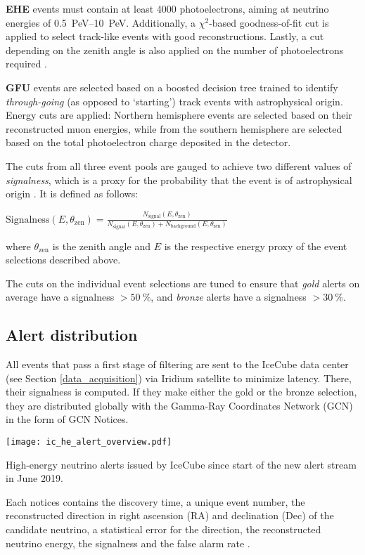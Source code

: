 \textbf{EHE} events must contain at least 4000 photoelectrons, aiming at neutrino energies of \SIrange{0.5}{10}{\peta\eV}. Additionally, a $\chi^2$-based goodness-of-fit cut is applied to select track-like events with good reconstructions. Lastly, a cut depending on the zenith angle is also applied on the number of photoelectrons required \cite{Tung2019}.

\textbf{GFU} events are selected based on a boosted decision tree trained to identify \textit{through-going} (as opposed to `starting') track events with astrophysical origin. Energy cuts are applied: Northern hemisphere events are selected based on their reconstructed muon energies, while from the southern hemisphere are selected based on the total photoelectron charge deposited in the detector.

The cuts from all three event pools are gauged to achieve two different values of \textit{signalness}, which is a proxy for the probability that the event is of astrophysical origin \cite{Tung2019}. It is defined as follows:
\begin{definition}\label{signalness_def}
$\text{Signalness}(E,\theta_\text{zen}) = \frac{N_\text{signal}(E,\theta_\text{zen})}{N_\text{signal}(E,\theta_\text{zen})+N_\text{background}(E,\theta_\text{zen})}$
\end{definition}
where $\theta_\text{zen}$ is the zenith angle and $E$ is the respective energy proxy of the event selections described above.

The cuts on the individual event selections are tuned to ensure that \textit{gold} alerts on average have a signalness $>\SI{50}{\percent}$, and \textit{bronze} alerts have a signalness $>\SI{30}{\percent}$.
\subsection{Alert distribution} \label{ic_alerts}
All events that pass a first stage of filtering are sent to the IceCube data center (see Section \ref{data_acquisition}) via Iridium satellite to minimize latency. There, their signalness is computed. If they make either the gold or the bronze selection, they are distributed globally with the Gamma-Ray Coordinates Network (GCN) in the form of GCN Notices.
\begin{marginfigure}
    \texttt{[image: ic\_he\_alert\_overview.pdf]}
    \caption[IceCube alert overview]{High-energy neutrino alerts issued by IceCube since start of the new alert stream in June 2019.}
\end{marginfigure}
Each notices contains the discovery time, a unique event number, the reconstructed direction in right ascension (RA) and declination (Dec) of the candidate neutrino, a statistical error for the direction, the reconstructed neutrino energy, the signalness and the false alarm rate \cite{Tung2019}.

